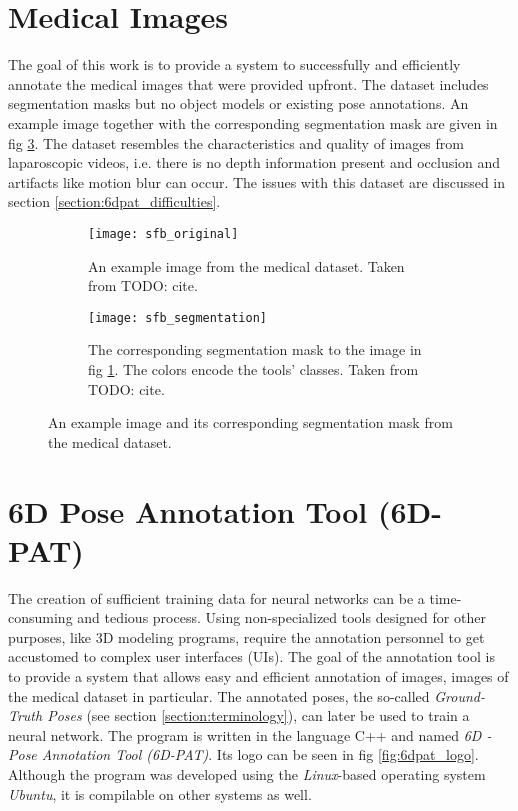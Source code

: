 \section{Medical Images}

The goal of this work is to provide a system to successfully and efficiently annotate the medical images that were provided upfront. The dataset includes segmentation masks but no object models or existing pose annotations. An example image together with the corresponding segmentation mask are given in fig \ref{fig:sfb}. The dataset resembles the characteristics and quality of images from laparoscopic videos, i.e. there is no depth information present and occlusion and artifacts like motion blur can occur. The issues with this dataset are discussed in section \ref{section:6dpat_difficulties}. 

\begin{figure}[!tbp]
	\centering
	\begin{subfigure}[t]{0.47\textwidth}
	\centering
    	\texttt{[image: sfb\_original]}
    	\caption{An example image from the medical dataset. Taken from TODO: cite.}
    	\label{fig:sfb_original}
	\end{subfigure}
	\hfill
	\begin{subfigure}[t]{0.47\textwidth}
	\centering
    	\texttt{[image: sfb\_segmentation]}
    	\caption{The corresponding segmentation mask to the image in fig \ref{fig:sfb_original}. The colors encode the tools' classes. Taken from TODO: cite.}
    	\label{fig:sfb_segmentation}
	\end{subfigure}
	\caption{An example image and its corresponding segmentation mask from the medical dataset.}
	\label{fig:sfb}
\end{figure} 

\section{6D Pose Annotation Tool (6D-PAT)}

The creation of sufficient training data for neural networks can be a time-consuming and tedious process. Using non-specialized tools designed for other purposes, like 3D modeling programs, require the annotation personnel to get accustomed to complex user interfaces (UIs). The goal of the annotation tool is to provide a system that allows easy and efficient annotation of images, images of the medical dataset in particular. The annotated poses, the so-called \textit{Ground-Truth Poses} (see section \ref{section:terminology}), can later be used to train a neural network. The program is written in the language C++ and named \textit{6D - Pose Annotation Tool (6D-PAT)}. Its logo can be seen in fig \ref{fig:6dpat_logo}. Although the program was developed using the \textit{Linux}-based operating system \textit{Ubuntu}, it is compilable on other systems as well.

